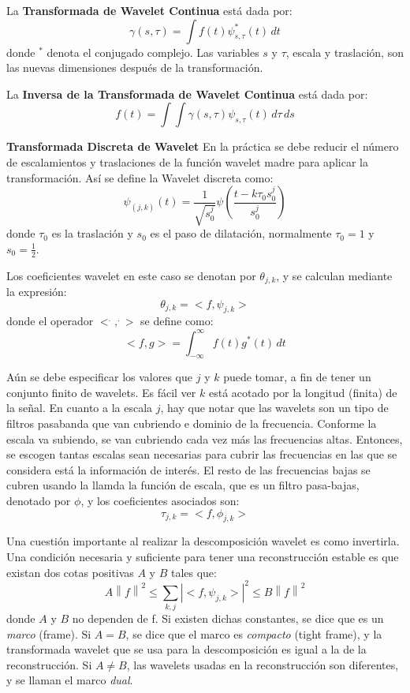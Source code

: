 \documentclass[a4paper,10pt,twocolumn]{article}
\begin{document}
 La \textbf{Transformada de Wavelet Continua} está dada por:
$$\gamma(s,\tau)= \displaystyle\int f(t)\psi_{s,\tau}^*(t)\,dt$$ 
donde $^*$ denota el conjugado complejo. Las variables $s$ y $\tau$, escala y traslación, son las nuevas dimensiones después de la transformación.

 La \textbf{Inversa de la Transformada de Wavelet Continua} está dada por:
$$f(t) = \displaystyle\int \displaystyle\int \gamma(s,\tau)\psi_{s,\tau}(t)\,d\tau\,ds$$

\textbf{Transformada Discreta de Wavelet}
 En la práctica se debe reducir el número de escalamientos y traslaciones de la función wavelet madre para aplicar la transformación. Así se define la Wavelet discreta como:
$$\psi_{(j,k)}(t) = \frac{1}{\sqrt{s_0^j}}\psi\left( \frac{t-k\tau_0s_0^j}{s_0^j}\right)$$ 
donde $\tau_0$ es la traslación y $s_0$ es el paso de dilatación, normalmente $\tau_0 = 1$ y $s_0 = \frac{1}{2}$. 

 Los coeficientes wavelet en este caso se denotan por $\theta_{j,k}$, y se calculan mediante la expresión:
$$\theta_{j,k} = <f,\psi_{j,k}>$$
donde el operador  $< ^.,^. >$ se define como:
$$<f,g> = \displaystyle\int_{-\infty}^{\infty}f(t)g^*(t)\,dt$$
 
 Aún se debe especificar los valores que $j$ y $k$ puede tomar, a fin de tener un conjunto finito de wavelets. Es fácil ver $k$ está acotado por la longitud (finita) de la señal. En cuanto a la escala $j$, hay que notar que las wavelets son un tipo de filtros pasabanda que van cubriendo e dominio de la frecuencia. Conforme la escala va subiendo, se van cubriendo cada vez más las frecuencias altas. Entonces, se escogen tantas escalas sean necesarias para cubrir las frecuencias en las que se considera está la información de interés. El resto de las frecuencias bajas se cubren usando la llamda la función de escala, que es un filtro pasa-bajas, denotado por $\phi$, y los coeficientes asociados son:
$$\tau_{j,k} = <f,\phi_{j,k}>$$

 Una cuestión importante al realizar la descomposición wavelet es como invertirla. Una condición necesaria y suficiente para tener una reconstrucción estable es que existan dos cotas positivas $A$ y $B$ tales que:
$$A\left \| f \right \|^2 \le \displaystyle\sum_{k,j} \left | < f,\psi_{j,k}> \right |^2 \le B\left \| f \right \|^2 $$
donde $A$ y $B$ no dependen de f. Si existen dichas constantes, se dice que es un \textit{marco} (frame). Si $A = B$, se dice que el marco es \textit{compacto} (tight frame), y la transformada wavelet que se usa para la descomposición es igual a la de la reconstrucción. Si $A \ne B$, las wavelets usadas en la reconstrucción son diferentes, y se llaman el marco \textit{dual}.
\end{document}
